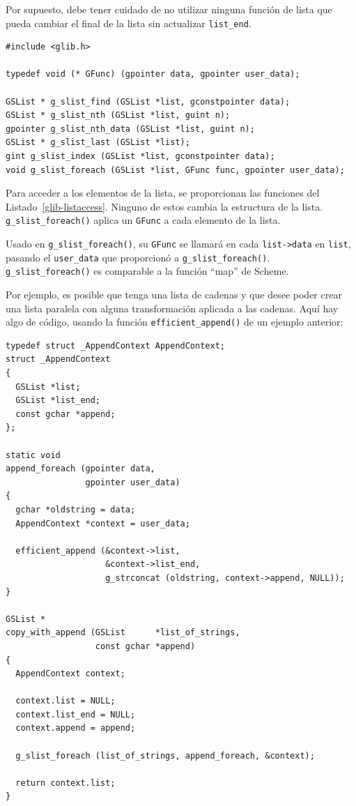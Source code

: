 Por supuesto, debe tener cuidado de no utilizar ninguna función de lista que pueda cambiar el final de la lista sin actualizar \lstinline{list_end}.

\begin{lstlisting}[style=GLib/GTK, caption={Acceder a datos en una lista vinculada}, label=glib-listaccess]
#include <glib.h>

typedef void (* GFunc) (gpointer data, gpointer user_data);

GSList * g_slist_find (GSList *list, gconstpointer data);
GSList * g_slist_nth (GSList *list, guint n);
gpointer g_slist_nth_data (GSList *list, guint n);
GSList * g_slist_last (GSList *list);
gint g_slist_index (GSList *list, gconstpointer data);
void g_slist_foreach (GSList *list, GFunc func, gpointer user_data);
\end{lstlisting}

Para acceder a los elementos de la lista, se proporcionan las funciones del Listado~\ref{glib-listaccess}. Ninguno de estos cambia la estructura de la lista. \lstinline{g_slist_foreach()} aplica un \lstinline{GFunc} a cada elemento de la lista.

Usado en \lstinline{g_slist_foreach()}, su \lstinline{GFunc} se llamará en cada \lstinline{list->data} en \lstinline{list}, pasando el \lstinline{user_data} que proporcionó a \lstinline{g_slist_foreach()}. \lstinline{g_slist_foreach()} es comparable a la función ``map'' de Scheme.

Por ejemplo, es posible que tenga una lista de cadenas y que desee poder crear una lista paralela con alguna transformación aplicada a las cadenas. Aquí hay algo de código, usando la función \lstinline{efficient_append()} de un ejemplo anterior:

\begin{lstlisting}[style=GLib/GTK]
typedef struct _AppendContext AppendContext;
struct _AppendContext
{
  GSList *list;
  GSList *list_end;
  const gchar *append;
};

static void
append_foreach (gpointer data,
                gpointer user_data)
{
  gchar *oldstring = data;
  AppendContext *context = user_data;

  efficient_append (&context->list,
                    &context->list_end,
                    g_strconcat (oldstring, context->append, NULL));
}

GSList *
copy_with_append (GSList      *list_of_strings,
                  const gchar *append)
{
  AppendContext context;

  context.list = NULL;
  context.list_end = NULL;
  context.append = append;

  g_slist_foreach (list_of_strings, append_foreach, &context);

  return context.list;
}
\end{lstlisting}

